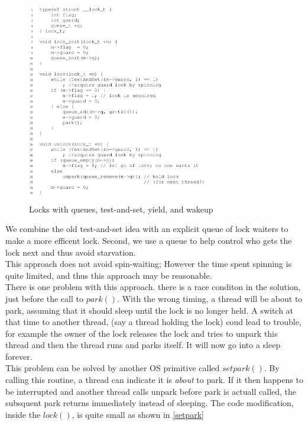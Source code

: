 \begin{figure}[h!]
    \label{289}
    \begin{center}
        \includegraphics[width=8cm, height=9cm]{img/289.png}
        \caption{Locks with queues, test-and-set, yield, and wakeup}
    \end{center}
\end{figure}

We combine the old test-and-set idea with an explicit queue of lock waiters to
make a more efficent lock. Second, we use a queue to help control who gets the
lock next and thus avoid starvation.\\

This approach does not avoid spin-waiting; However the time spent spinning is
quite limited, and thus this approach may be reasonable.\\

There is one problem with this approach. there is a race conditon in the solution,
just before the call to $park()$. With the wrong timing, a thread
will be about to park, assuming that it should sleep until the lock is no longer
held. A switch at that time to another thread, (say a thread holding the lock)
coud lead to trouble, for example the owner of the lock releases the lock
and tries to unpark this thread and then the thread runs and parks itself.
It will now go into a sleep forever.\\

This problem can be solved by another OS primitive called $setpark()$. By
calling this routine, a thread can indicate it is \textit{about} to park.
If it then happens to be interrupted and another thread calls unpark
before park is actuall called, the subsquent park returns immediately instead
of sleeping. The code modification, inside the $lock()$, is quite small as shown
in \ref{setpark}

